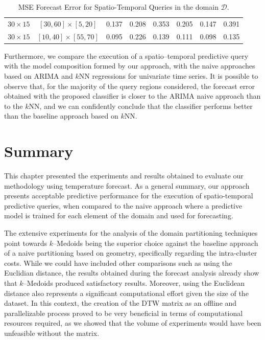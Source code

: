\begin{table}[h]
\begin{tabular}{|c|c|r|r|r|r|r|r|}
        $30 \times 15$ & $[30, 60] \times [ 5, 20]$ & 0.137 & 0.208 & 0.353 & 0.205 & 0.147 & \cellcolor{red!20}0.391 \\ %
        $30 \times 15$ & $[10, 40] \times [55, 70]$ & 0.095 & 0.226 & 0.139 & 0.111 & 0.098 & \cellcolor{red!20}0.135 \\ %
        \hline
	\end{tabular}
	\caption{MSE Forecast Error for Spatio-Temporal Queries in the domain $\mathcal{D}$.}
	\label{Table:MSEForecasError}
\end{table}

Furthermore, we compare the execution of a spatio--temporal predictive query with the model composition formed by our approach, with the naive approaches based on ARIMA and $k$NN regressions for univariate time series. It is possible to observe that, for the majority of the query regions considered, the forecast error obtained with the proposed classifier is closer to the ARIMA naive approach than to the $k$NN, and we can confidently conclude that the classifier performs better than the baseline approach based on $k$NN.

\section{Summary} 

This chapter presented the experiments and results obtained to evaluate our methodology using temperature forecast. As a general summary, our approach presents acceptable predictive performance for the execution of spatio-temporal predictive queries, when compared to the naive approach where a predictive model is trained for each element of the domain and used for forecasting. %

The extensive experiments for the analysis of the domain partitioning techniques point towards $k$--Medoids being the superior choice against the baseline approach of a naive partitioning based on geometry, specifically regarding the intra-cluster costs. While we could have included other comparisons such as using the Euclidian distance, the results obtained during the forecast analysis already show that $k$--Medoids produced satisfactory results. Moreover, using the Euclidean distance also represents a significant computational effort given the size of the dataset. In this context, the creation of the DTW matrix as an offline and parallelizable process proved to be very beneficial in terms of computational resources required, as we showed that the volume of experiments would have been unfeasible without the matrix.

